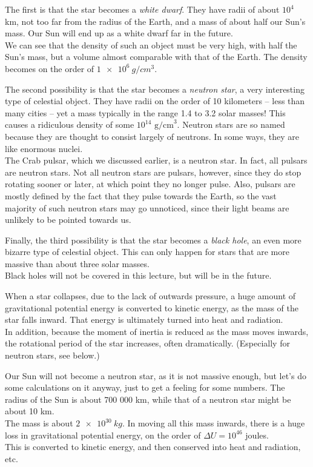 The first is that the star becomes a \emph{white dwarf}. They have radii of about $10^4$ km, not too far from the radius of the Earth, and a mass of about half our Sun's mass. Our Sun will end up as a white dwarf far in the future.\\
We can see that the density of such an object must be very high, with half the Sun's mass, but a volume almost comparable with that of the Earth. The density becomes on the order of $\SI{1e6}{g/cm^3}$.

The second possibility is that the star becomes a \emph{neutron star}, a very interesting type of celestial object. They have radii on the order of 10 kilometers -- less than many cities -- yet a mass typically in the range 1.4 to 3.2 solar masses! This causes a ridiculous density of some $10^{14} \text{ g/cm}^3$. Neutron stars are so named because they are thought to consist largely of neutrons. In some ways, they are like enormous nuclei.\\
The Crab pulsar, which we discussed earlier, is a neutron star. In fact, all pulsars are neutron stars. Not all neutron stars are pulsars, however, since they do stop rotating sooner or later, at which point they no longer pulse. Also, pulsars are mostly defined by the fact that they pulse towards the Earth, so the vast majority of such neutron stars may go unnoticed, since their light beams are unlikely to be pointed towards us.

Finally, the third possibility is that the star becomes a \emph{black hole}, an even more bizarre type of celestial object. This can only happen for stars that are more massive than about three solar masses.\\
Black holes will not be covered in this lecture, but will be in the future.

When a star collapses, due to the lack of outwards pressure, a huge amount of gravitational potential energy is converted to kinetic energy, as the mass of the star falls inward. That energy is ultimately turned into heat and radiation.\\
In addition, because the moment of inertia is reduced as the mass moves inwards, the rotational period of the star increases, often dramatically. (Especially for neutron stars, see below.)

Our Sun will not become a neutron star, as it is not massive enough, but let's do some calculations on it anyway, just to get a feeling for some numbers. The radius of the Sun is about 700 000 km, while that of a neutron star might be about 10 km.\\
The mass is about $\SI{2e30}{kg}$. In moving all this mass inwards, there is a huge loss in gravitational potential energy, on the order of $\Delta U = 10^{46}$ joules.\\
This is converted to kinetic energy, and then conserved into heat and radiation, etc.

